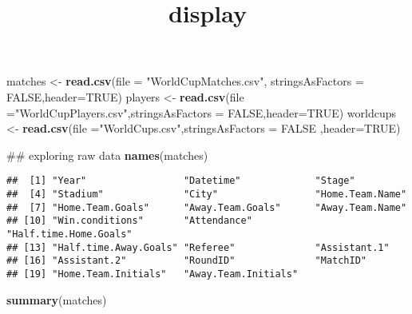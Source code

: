 \documentclass[]{article}
\title{display}
\author{}
\date{}
\newenvironment{Shaded}{\begin{snugshade}}{\end{snugshade}}
\newcommand{\KeywordTok}[1]{\textcolor[rgb]{0.13,0.29,0.53}{\textbf{#1}}}
\newcommand{\DataTypeTok}[1]{\textcolor[rgb]{0.13,0.29,0.53}{#1}}
\newcommand{\StringTok}[1]{\textcolor[rgb]{0.31,0.60,0.02}{#1}}
\newcommand{\OtherTok}[1]{\textcolor[rgb]{0.56,0.35,0.01}{#1}}
\newcommand{\NormalTok}[1]{#1}
\begin{document}
\maketitle

\begin{Shaded}
\begin{Highlighting}[]
\NormalTok{matches <-}\StringTok{ }\KeywordTok{read.csv}\NormalTok{(}\DataTypeTok{file =} \StringTok{"WorldCupMatches.csv"}\NormalTok{, }\DataTypeTok{stringsAsFactors =} \OtherTok{FALSE}\NormalTok{,}\DataTypeTok{header=}\OtherTok{TRUE}\NormalTok{)}
\NormalTok{players <-}\StringTok{ }\KeywordTok{read.csv}\NormalTok{(}\DataTypeTok{file =}\StringTok{"WorldCupPlayers.csv"}\NormalTok{,}\DataTypeTok{stringsAsFactors =} \OtherTok{FALSE}\NormalTok{,}\DataTypeTok{header=}\OtherTok{TRUE}\NormalTok{)}
\NormalTok{worldcups <-}\StringTok{ }\KeywordTok{read.csv}\NormalTok{(}\DataTypeTok{file =}\StringTok{"WorldCups.csv"}\NormalTok{,}\DataTypeTok{stringsAsFactors =} \OtherTok{FALSE}\NormalTok{ ,}\DataTypeTok{header=}\OtherTok{TRUE}\NormalTok{)}


\NormalTok{## exploring raw data}
\KeywordTok{names}\NormalTok{(matches)}
\end{Highlighting}
\end{Shaded}

\begin{verbatim}
##  [1] "Year"                 "Datetime"             "Stage"               
##  [4] "Stadium"              "City"                 "Home.Team.Name"      
##  [7] "Home.Team.Goals"      "Away.Team.Goals"      "Away.Team.Name"      
## [10] "Win.conditions"       "Attendance"           "Half.time.Home.Goals"
## [13] "Half.time.Away.Goals" "Referee"              "Assistant.1"         
## [16] "Assistant.2"          "RoundID"              "MatchID"             
## [19] "Home.Team.Initials"   "Away.Team.Initials"
\end{verbatim}

\begin{Shaded}
\begin{Highlighting}[]
\KeywordTok{summary}\NormalTok{(matches)}
\end{Highlighting}
\end{Shaded}
\end{document}
